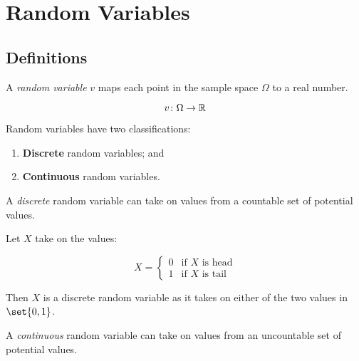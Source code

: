 \section{Random Variables}

\subsection{Definitions}

\begin{definition}
    A \textit{random variable} $v$ maps each point in the sample space $\Omega$ to a real number.
    
    \begin{equation}
        v \colon \Omega \to \mathbb{R}
    \end{equation}
    
    Random variables have two classifications:
    
    \begin{enumerate}
        \item \textbf{Discrete} random variables; and
        \item \textbf{Continuous} random variables.
    \end{enumerate}
\end{definition}

\begin{definition}
    A \textit{discrete} random variable can take on values from a countable set of potential values.
\end{definition}

\begin{example}
    Let $X$ take on the values:
    
    \begin{equation*}
        X =
        \begin{cases}
            0 & \text{if $X$ is head} \\
            1 & \text{if $X$ is tail}
        \end{cases}
    \end{equation*}
    
    Then $X$ is a discrete random variable as it takes on either of the two values in $\set{0, 1}$.
\end{example}

\begin{definition}
    A \textit{continuous} random variable can take on values from an uncountable set of potential values.
\end{definition}

